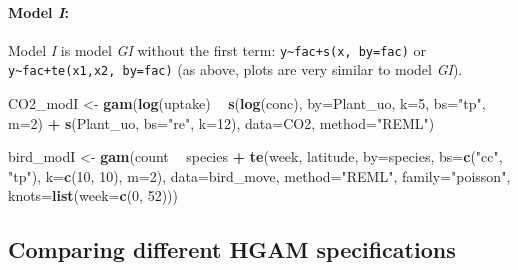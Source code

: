 \documentclass[12pt]{article}
\newenvironment{Shaded}{\begin{snugshade}}{\end{snugshade}}
\newcommand{\KeywordTok}[1]{\textcolor[rgb]{0.13,0.29,0.53}{\textbf{#1}}}
\newcommand{\DataTypeTok}[1]{\textcolor[rgb]{0.13,0.29,0.53}{#1}}
\newcommand{\DecValTok}[1]{\textcolor[rgb]{0.00,0.00,0.81}{#1}}
\newcommand{\StringTok}[1]{\textcolor[rgb]{0.31,0.60,0.02}{#1}}
\newcommand{\OperatorTok}[1]{\textcolor[rgb]{0.81,0.36,0.00}{\textbf{#1}}}
\newcommand{\NormalTok}[1]{#1}
\let\oldparagraph\paragraph
\renewcommand{\paragraph}[1]{\oldparagraph{#1}\mbox{}}
\begin{document}
\paragraph{\texorpdfstring{Model \emph{I}:}{Model I:}}\label{model-i}

Model \emph{I} is model \emph{GI} without the first term:
\texttt{y\textasciitilde{}fac+s(x,\ by=fac)} or
\texttt{y\textasciitilde{}fac+te(x1,x2,\ by=fac)} (as above, plots are
very similar to model \emph{GI}).

\begin{Shaded}
\begin{Highlighting}[]
\NormalTok{CO2_modI <-}\StringTok{ }\KeywordTok{gam}\NormalTok{(}\KeywordTok{log}\NormalTok{(uptake) }\OperatorTok{~}\StringTok{ }\KeywordTok{s}\NormalTok{(}\KeywordTok{log}\NormalTok{(conc), }\DataTypeTok{by=}\NormalTok{Plant_uo, }\DataTypeTok{k=}\DecValTok{5}\NormalTok{, }\DataTypeTok{bs=}\StringTok{"tp"}\NormalTok{, }\DataTypeTok{m=}\DecValTok{2}\NormalTok{) }\OperatorTok{+}
\StringTok{                  }\KeywordTok{s}\NormalTok{(Plant_uo, }\DataTypeTok{bs=}\StringTok{"re"}\NormalTok{, }\DataTypeTok{k=}\DecValTok{12}\NormalTok{),}
                \DataTypeTok{data=}\NormalTok{CO2, }\DataTypeTok{method=}\StringTok{"REML"}\NormalTok{)}


\NormalTok{bird_modI <-}\StringTok{ }\KeywordTok{gam}\NormalTok{(count }\OperatorTok{~}\StringTok{ }\NormalTok{species }\OperatorTok{+}\StringTok{ }\KeywordTok{te}\NormalTok{(week, latitude, }\DataTypeTok{by=}\NormalTok{species,}
                                      \DataTypeTok{bs=}\KeywordTok{c}\NormalTok{(}\StringTok{"cc"}\NormalTok{, }\StringTok{"tp"}\NormalTok{), }\DataTypeTok{k=}\KeywordTok{c}\NormalTok{(}\DecValTok{10}\NormalTok{, }\DecValTok{10}\NormalTok{), }\DataTypeTok{m=}\DecValTok{2}\NormalTok{),}
                 \DataTypeTok{data=}\NormalTok{bird_move, }\DataTypeTok{method=}\StringTok{"REML"}\NormalTok{, }\DataTypeTok{family=}\StringTok{"poisson"}\NormalTok{,}
                 \DataTypeTok{knots=}\KeywordTok{list}\NormalTok{(}\DataTypeTok{week=}\KeywordTok{c}\NormalTok{(}\DecValTok{0}\NormalTok{, }\DecValTok{52}\NormalTok{)))}
\end{Highlighting}
\end{Shaded}

\subsection{Comparing different HGAM
specifications}\label{comparing-different-hgam-specifications}
\end{document}
